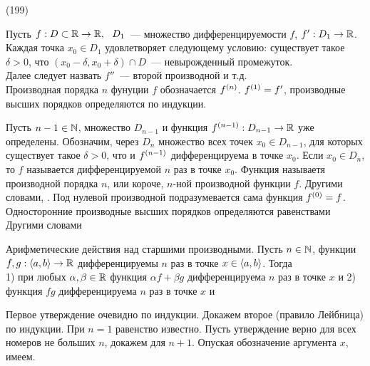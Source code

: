 (199)

Пусть $f: D \subset \mathbb{R} \to \mathbb{R},\ \  D_1$~--- множество дифференцируемости $f$, $f': D_1 \to \mathbb{R}$. Каждая точка $x_0 \in D_1$ удовлетворяет следующему условию: существует такое $\delta > 0$, что $(x_0 - \delta, x_0 + \delta) \cap D$~--- невырожденный промежуток.\\
Далее следует назвать $f''$~--- второй производной и т.д.\\
Производная порядка $n$ фунуции $f$ обозначается $f^{(n)}$. $f^{(1)} = f'$, производные высших порядков определяются по индукции.

\Op Пусть $n - 1 \in \mathbb{N}$, множество $D_{n - 1}$ и функция $f^{(n-1)}: D_{n - 1} \to \mathbb{R}$ уже определены. Обозначим, через $D_n$ множество всех точек $x_0 \in D_{n - 1}$, для которых существует такое $\delta > 0$, что  и $f^{(n - 1)}$ дифференцируема в точке $x_0$.  Если $x_0 \in D_n$, то $f$ называется дифференцируемой $n$ раз в точке $x_0$. Функция  называетя производной порядка $n$, или короче, $n$-ной производной функции $f$. Другими словами, . Под нулевой производной подразумевается сама функция $f^{(0)} = f$. Односторонние производные высших порядков определяются равенствами  Другими словами 

\T \q Арифметические действия над старшими производными. Пусть $n \in \mathbb{N}$, функции $f, g: \langle a, b \rangle \to\mathbb{R}$ дифференцируемы $n$ раз в точке $x \in \langle a, b \rangle$. Тогда\\
1) при любых $\alpha, \beta \in \mathbb{R}$  функция $\alpha f + \beta g$ дифференцируема $n$ раз в точке $x$ и 
2) функция $fg$ дифференцируема $n$ раз в точке $x$ и 

\D Первое утверждение очевидно по индукции. Докажем второе (правило Лейбница) по индукции. При $n = 1$ равенство известно. Пусть утверждение верно для всех номеров не больших $n$, докажем для $n + 1$. Опуская обозначение аргумента $x$, имеем.

